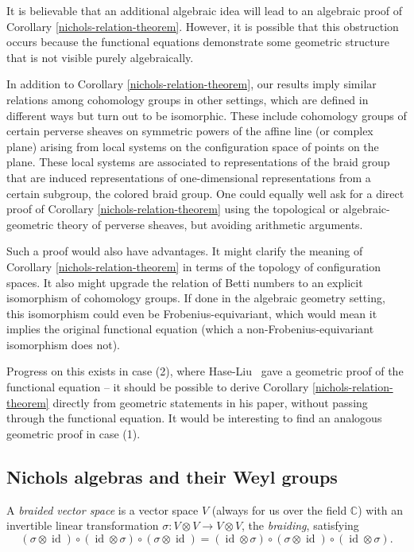 \documentclass[11pt,letterpaper]{article}
\theoremstyle{definition}
\theoremstyle{remark}
\numberwithin{equation}{section}
\theoremstyle{dotless}
\begin{document}
It is believable that an additional algebraic idea will lead to an algebraic proof of Corollary \ref{nichols-relation-theorem}. However, it is possible that this obstruction occurs because the functional equations demonstrate some geometric structure that is not visible purely algebraically.

In addition to Corollary \ref{nichols-relation-theorem}, our results imply similar relations among cohomology groups in other settings, which are defined in different ways but turn out to be isomorphic. These include cohomology groups of certain perverse sheaves on symmetric powers of the affine line (or complex plane) arising from local systems on the configuration space of points on the plane. These local systems are associated to representations of the braid group that are induced representations of one-dimensional representations from a certain subgroup, the colored braid group. One could equally well ask for a direct proof of Corollary \ref{nichols-relation-theorem} using the topological or algebraic-geometric theory of perverse sheaves, but avoiding arithmetic arguments.

Such a proof would also have advantages. It might clarify the meaning of Corollary \ref{nichols-relation-theorem} in terms of the topology of configuration spaces. It also might upgrade the relation of Betti numbers to an explicit isomorphism of cohomology groups. If done in the algebraic geometry setting, this isomorphism could even be Frobenius-equivariant, which would mean it implies the original functional equation (which a non-Frobenius-equivariant isomorphism does not).

Progress on this exists in case (2), where Hase-Liu~\cite{HaseLiu24} gave a geometric proof of the functional equation -- it should be possible to derive Corollary \ref{nichols-relation-theorem} directly from geometric statements in his paper, without passing through the functional equation. It would be interesting to find an analogous geometric proof in case (1).






\subsection{Nichols algebras and their Weyl groups}\label{nichols-intro}

A \emph{braided vector space} is a vector space $V$ (always for us over the field $\mathbb C$) with an invertible linear transformation $\sigma \colon V \otimes V \to V \otimes V$, the \emph{braiding}, satisfying \[ (\sigma \otimes \operatorname{id})  \circ (\operatorname{id} \otimes \sigma) \circ (\sigma \otimes \operatorname{id})= (\operatorname{id} \otimes \sigma) \circ (\sigma \otimes \operatorname{id}) \circ (\operatorname{id} \otimes \sigma). \]
\end{document}
